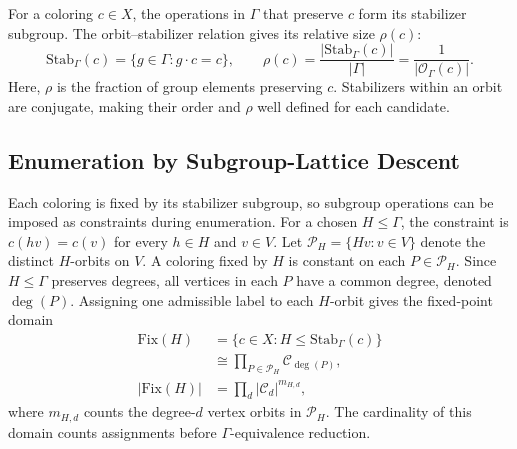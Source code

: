 \documentclass[a5paper, 10pt]{article}
\begin{document}
For a coloring $c\in X$, the operations in $\Gamma$ that preserve $c$ form its stabilizer subgroup. The orbit--stabilizer relation gives its relative size $\rho(c)$:
\begin{equation}
\mathrm{Stab}_{\Gamma}(c)=\{g\in\Gamma:g\cdot c=c\},\qquad
\rho(c)=\frac{|\mathrm{Stab}_{\Gamma}(c)|}{|\Gamma|}
=\frac{1}{|\mathcal{O}_{\Gamma}(c)|}.
\label{eq:stabilizer_rho}
\end{equation}
Here, $\rho$ is the fraction of group elements preserving $c$. Stabilizers within an orbit are conjugate, making their order and $\rho$ well defined for each candidate.


\subsection{Enumeration by Subgroup-Lattice Descent}


\label{sec:enumeration}
Each coloring is fixed by its stabilizer subgroup, so subgroup operations can be imposed as constraints during enumeration. For a chosen $H\leq\Gamma$, the constraint is $c(hv)=c(v)$ for every $h\in H$ and $v\in V$. Let $\mathcal{P}_H=\{Hv:v\in V\}$ denote the distinct $H$-orbits on $V$. A coloring fixed by $H$ is constant on each $P\in\mathcal{P}_H$. Since $H\leq\Gamma$ preserves degrees, all vertices in each $P$ have a common degree, denoted $\deg(P)$. Assigning one admissible label to each $H$-orbit gives the fixed-point domain
\begin{equation}
\begin{aligned}
\mathrm{Fix}(H)&=\{c\in X:H\leq\mathrm{Stab}_{\Gamma}(c)\}\\
&\cong\prod_{P\in\mathcal{P}_H}\mathcal{C}_{\deg(P)},\\
|\mathrm{Fix}(H)|&=\prod_d|\mathcal{C}_d|^{m_{H,d}},
\end{aligned}
\label{eq:fixed_layer}
\end{equation}
where $m_{H,d}$ counts the degree-$d$ vertex orbits in $\mathcal{P}_H$. The cardinality of this domain counts assignments before $\Gamma$-equivalence reduction.
\end{document}
